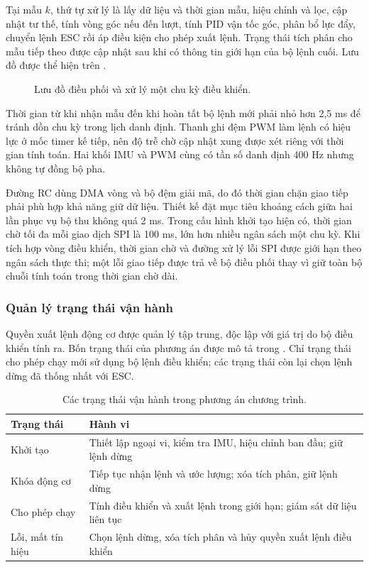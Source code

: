 Tại mẫu $k$, thứ tự xử lý là lấy dữ liệu và thời gian mẫu, hiệu chỉnh và lọc, cập nhật tư thế, tính vòng góc nếu đến lượt, tính PID vận tốc góc, phân bổ lực đẩy, chuyển lệnh ESC rồi áp điều kiện cho phép xuất lệnh. Trạng thái tích phân cho mẫu tiếp theo được cập nhật sau khi có thông tin giới hạn của bộ lệnh cuối. Lưu đồ được thể hiện trên .

\begin{figure}[H]
	\centering
	\resizebox{0.90\linewidth}{!}{}
	\caption{Lưu đồ điều phối và xử lý một chu kỳ điều khiển.}
	\label{fig:design-control-cycle}
\end{figure}

Thời gian từ khi nhận mẫu đến khi hoàn tất bộ lệnh mới phải nhỏ hơn 2,5 ms để tránh dồn chu kỳ trong lịch danh định. Thanh ghi đệm PWM làm lệnh có hiệu lực ở mốc timer kế tiếp, nên độ trễ chờ cập nhật xung được xét riêng với thời gian tính toán. Hai khối IMU và PWM cùng có tần số danh định 400 Hz nhưng không tự đồng bộ pha.

Đường RC dùng DMA vòng và bộ đệm giải mã, do đó thời gian chặn giao tiếp phải phù hợp khả năng giữ dữ liệu. Thiết kế đặt mục tiêu khoảng cách giữa hai lần phục vụ bộ thu không quá 2 ms. Trong cấu hình khởi tạo hiện có, thời gian chờ tối đa mỗi giao dịch SPI là 100 ms, lớn hơn nhiều ngân sách một chu kỳ. Khi tích hợp vòng điều khiển, thời gian chờ và đường xử lý lỗi SPI được giới hạn theo ngân sách thực thi; một lỗi giao tiếp được trả về bộ điều phối thay vì giữ toàn bộ chuỗi tính toán trong thời gian chờ dài.

\subsubsection{Quản lý trạng thái vận hành}

Quyền xuất lệnh động cơ được quản lý tập trung, độc lập với giá trị do bộ điều khiển tính ra. Bốn trạng thái của phương án được mô tả trong . Chỉ trạng thái cho phép chạy mới sử dụng bộ lệnh điều khiển; các trạng thái còn lại chọn lệnh dừng đã thống nhất với ESC.

\begin{table}[htbp]
	\centering
	\caption{Các trạng thái vận hành trong phương án chương trình.}
	\label{tab:design-operation-states}
	\begin{tabularx}{\linewidth}{|C{3.2cm}|Y|}
		\hline
		\textbf{Trạng thái} & \textbf{Hành vi}                                                       \\
		\hline
		Khởi tạo            & Thiết lập ngoại vi, kiểm tra IMU, hiệu chỉnh ban đầu; giữ lệnh dừng    \\
		\hline
		Khóa động cơ        & Tiếp tục nhận lệnh và ước lượng; xóa tích phân, giữ lệnh dừng          \\
		\hline
		Cho phép chạy       & Tính điều khiển và xuất lệnh trong giới hạn; giám sát dữ liệu liên tục \\
		\hline
		Lỗi, mất tín hiệu   & Chọn lệnh dừng, xóa tích phân và hủy quyền xuất lệnh điều khiển        \\
		\hline
	\end{tabularx}
\end{table}

